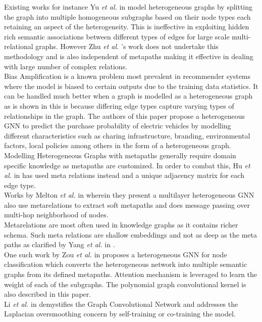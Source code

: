 \documentclass{report} %
\begin{document}
Existing works for instance Yu \textit{et al.} in \cite{PR-HGNN-2024} model heterogeneous graphs by splitting the graph into multiple 
homogeneous subgraphs based on their node types each retaining an aspect of the heterogeneity.
This is ineffective in exploiting hidden rich semantic associations between different types of edges for large scale multi-relational graphs.
However Zhu \textit{et al.} \cite{RSHGNN-2019}'s work does not undertake this methodology and is also independent of metapaths making it effective 
in dealing with large number of complex relations.\\
Bias Amplification is a known problem most prevalent in recommender systems where the model is biased to certain outputs due to the training data statistics.
It can be handled much better when a graph is modelled as a heterogeneous graph as is shown in \cite{EV HGNN-2023} this is because differing 
edge types capture varying types of relationships in the graph. The authors of this paper propose a heterogeneous \ac{GNN} to predict the purchase probability of electric vehicles 
by modelling different characteristics such as charing infrastructure, branding, environmental factors, local policies among others in the form of a heterogeneous graph.\\
Modelling Heterogeneous Graphs with metapaths generally require domain specific knowledge as metapaths are customized. 
In order to combat this, Hu \textit{et al.} in \cite{HGT-2022} has used meta relations instead and a unique adjacency matrix for each edge type.\\
Works by Melton \textit{et al.} in \cite{MHGNN-2023} wherein they present a multilayer heterogeneous \ac{GNN} also use metarelations to extract soft metapaths 
and does message passing over multi-hop neighborhood of nodes. \\
Metarelations are most often used in knowledge graphs as it contains richer schema. 
Such meta relations are shallow embeddings and not as deep as the meta paths as clarified by Yang \textit{et al.} in \cite{HGNN-2020}. \\
One such work by Zou \textit{et al.} in \cite{HNNC-2023} proposes a heterogeneous \ac{GNN} for node classification which converts the 
heterogeneous network into multiple semantic graphs from its defined metapaths. Attention mechanism is leveraged to learn the weight of each of the subgraphs. 
The polynomial graph convolutional kernel is also described in this paper.\\ 
Li \textit{et al.} in \cite{GCN-2018} demystifies the Graph Convolutional Network and addresses the Laplacian oversmoothing concern by self-training or co-training the model.
\end{document}
